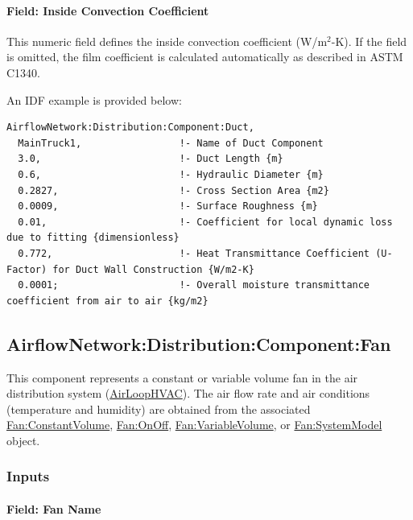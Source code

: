 \paragraph{Field: Inside Convection Coefficient}\label{field-inside-convection-coefficent}

This numeric field defines the inside convection coefficient (W/m\(^{2}\)-K). If the field is omitted, the film coefficient is calculated automatically as described in ASTM C1340.

An IDF example is provided below:

\begin{lstlisting}
AirflowNetwork:Distribution:Component:Duct,
  MainTruck1,                 !- Name of Duct Component
  3.0,                        !- Duct Length {m}
  0.6,                        !- Hydraulic Diameter {m}
  0.2827,                     !- Cross Section Area {m2}
  0.0009,                     !- Surface Roughness {m}
  0.01,                       !- Coefficient for local dynamic loss due to fitting {dimensionless}
  0.772,                      !- Heat Transmittance Coefficient (U-Factor) for Duct Wall Construction {W/m2-K}
  0.0001;                     !- Overall moisture transmittance coefficient from air to air {kg/m2}
\end{lstlisting}

\subsection{AirflowNetwork:Distribution:Component:Fan}\label{airflownetworkdistributioncomponentfan}

This component represents a constant or variable volume fan in the air distribution system (\hyperref[airloophvac]{AirLoopHVAC}). The air flow rate and air conditions (temperature and humidity) are obtained from the associated \hyperref[fanconstantvolume]{Fan:ConstantVolume}, \hyperref[fanonoff]{Fan:OnOff}, \hyperref[fanvariablevolume]{Fan:VariableVolume}, or \hyperref[fansystemmodel]{Fan:SystemModel} object.

\subsubsection{Inputs}\label{inputs-16-001}

\paragraph{Field: Fan Name}\label{field-fan-name-000}

